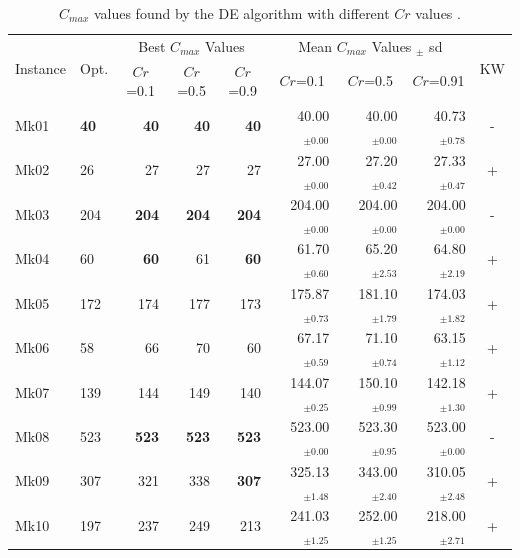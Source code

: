 \begin{table}[!tb]
    \scriptsize
    \centering

    \caption{$C_{max}$ values found by the DE algorithm with different $Cr$ values%
    .}
\begin{tabular}{|l|l|rrr|rrr|c|}
\hline
\multicolumn{1}{|c|}{\multirow{2}{*}{Instance}} & \multicolumn{1}{c}{\multirow{2}{*}{Opt.}} & \multicolumn{3}{|c|}{Best $C_{max}$ Values} & \multicolumn{3}{c|}{Mean $C_{max}$ Values  $_{\pm}$ sd} & \multicolumn{1}{c|}{\multirow{2}{*}{KW}}\\
\cline{3-8}
\multicolumn{1}{|c|}{} & \multicolumn{1}{c|}{} & \multicolumn{1}{|c}{$Cr$=0.1} & \multicolumn{1}{c}{$Cr$=0.5} & \multicolumn{1}{c|}{$Cr$=0.9} & \multicolumn{1}{c}{$Cr$=0.1} & \multicolumn{1}{c}{$Cr$=0.5} & \multicolumn{1}{c|}{$Cr$=0.91} &\\
\hline
    Mk01  & \textbf{40} & \textbf{40} & \textbf{40} & \textbf{40} & 40.00  $_{\pm 0.00   }$    & 40.00  $_{\pm 0.00   }$    & 40.73  $_{\pm 0.78   }$    & - \\
    Mk02  & 26    & 27    & 27    & 27    & 27.00  $_{\pm 0.00   }$    & 27.20  $_{\pm 0.42   }$    & 27.33  $_{\pm 0.47   }$    & + \\
    Mk03  & 204   & \textbf{204} & \textbf{204} & \textbf{204} & 204.00  $_{\pm 0.00   }$    & 204.00  $_{\pm 0.00   }$    & 204.00  $_{\pm 0.00   }$    & - \\
    Mk04  & 60    & \textbf{60} & 61    & \textbf{60} & 61.70  $_{\pm 0.60   }$    & 65.20  $_{\pm 2.53   }$    & 64.80  $_{\pm 2.19   }$    & + \\
    Mk05  & 172   & 174   & 177   & 173   & 175.87  $_{\pm 0.73   }$    & 181.10  $_{\pm 1.79   }$    & 174.03  $_{\pm 1.82   }$    & + \\
    Mk06  & 58    & 66    & 70    & 60    & 67.17  $_{\pm 0.59   }$    & 71.10  $_{\pm 0.74   }$    & 63.15  $_{\pm 1.12   }$    & + \\
    Mk07  & 139   & 144   & 149   & 140   & 144.07  $_{\pm 0.25   }$    & 150.10  $_{\pm 0.99   }$    & 142.18  $_{\pm 1.30   }$    & + \\
    Mk08  & 523   & \textbf{523} & \textbf{523} & \textbf{523} & 523.00  $_{\pm 0.00   }$    & 523.30  $_{\pm 0.95   }$    & 523.00  $_{\pm 0.00   }$    & - \\
    Mk09  & 307   & 321   & 338   & \textbf{307} & 325.13  $_{\pm 1.48   }$    & 343.00  $_{\pm 2.40   }$    & 310.05  $_{\pm 2.48   }$    & + \\
    Mk10  & 197   & 237   & 249   & 213   & 241.03  $_{\pm 1.25   }$    & 252.00  $_{\pm 1.25   }$    & 218.00  $_{\pm 2.71   }$    & + \\
\hline 
\end{tabular}
    \label{tab:resultsDE}
\end{table}


